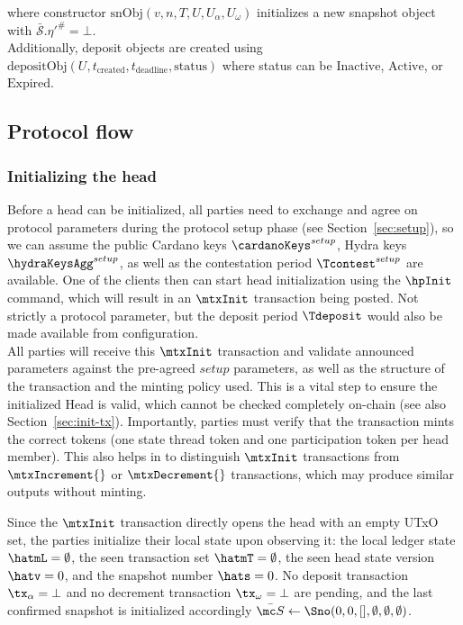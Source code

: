 where constructor $\text{snObj}(v, n, T, U, U_\alpha, U_\omega)$ initializes a
new snapshot object with $\bar{\mathcal{S}}.{\eta'}^{\#} = \bot$. \\

Additionally, deposit objects are created using
$\text{depositObj}(U, t_{\text{created}}, t_{\text{deadline}}, \text{status})$
where status can be $\text{Inactive}$, $\text{Active}$, or $\text{Expired}$.

\subsection{Protocol flow}

\subsubsection{Initializing the head}

\quad Before a head can be initialized, all parties need
to exchange and agree on protocol parameters during the protocol setup phase
(see Section~\ref{sec:setup}), so we can assume the public Cardano keys
$\cardanoKeys^{setup}$, Hydra keys $\hydraKeysAgg^{setup}$, as well as the
contestation period $\Tcontest^{setup}$ are available. One of the clients then
can start head initialization using the $\hpInit$ command, which will result in
an $\mtxInit$ transaction being posted. Not strictly a protocol parameter, but
the deposit period $\Tdeposit$ would also be made available from
configuration.\\

\quad All parties will receive this $\mtxInit$
transaction and validate announced parameters against the pre-agreed $setup$
parameters, as well as the structure of the transaction and the minting policy
used. This is a vital step to ensure the initialized Head is valid, which cannot
be checked completely on-chain (see also Section~\ref{sec:init-tx}).
Importantly, parties must verify that the transaction mints the correct tokens
(one state thread token and one participation token per head member). This also
helps in to distinguish $\mtxInit$ transactions from $\mtxIncrement{}$ or
$\mtxDecrement{}$ transactions, which may produce similar outputs without
minting.

Since the $\mtxInit$ transaction directly opens the head with an empty UTxO set,
the parties initialize their local state upon observing it: the local ledger
state $\hatmL = \emptyset$, the seen transaction set $\hatmT = \emptyset$, the
seen head state version $\hatv = 0$, and the snapshot number $\hats = 0$. No
deposit transaction $\tx_{\alpha} = \bot$ and no decrement transaction
$\tx_{\omega} = \bot$ are pending, and the last confirmed snapshot is
initialized accordingly
$\bar{\mc S} \gets \Sno(0, 0, [], \emptyset, \emptyset, \emptyset)$.

